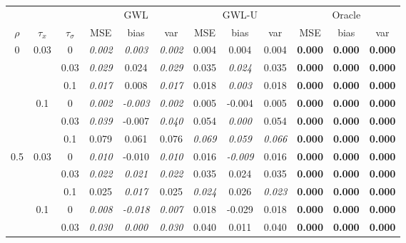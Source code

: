 \documentclass[authoryear, review, 11pt]{elsarticle}
\begin{document}
		
		\begin{table}[ht]
		\begin{center}
		\begin{tabular}{ccc | ccc | ccc | ccc }
		&&&\multicolumn{3}{c}{GWL}&\multicolumn{3}{c}{GWL-U}&\multicolumn{3}{c}{Oracle}\\
		$\rho$ & $\tau_x$ & $\tau_\sigma$ & MSE & bias & var &  MSE & bias & var &  MSE & bias & var\\   \hline
		\multirow{6}{*}{0} & \multirow{3}{*}{0.03} & 0 & \emph{0.002} & \emph{0.003} & \emph{0.002} & 0.004 & 0.004 & 0.004 & \textbf{0.000} & \textbf{0.000} & \textbf{0.000} \\ 
		 &  & 0.03 &   \emph{0.029} & 0.024 & \emph{0.029} & 0.035 & \emph{0.024} & 0.035 & \textbf{0.000} & \textbf{0.000} & \textbf{0.000} \\ 
		 &  & 0.1 &   \emph{0.017} & 0.008 & \emph{0.017} & 0.018 & \emph{0.003} & 0.018 & \textbf{0.000} & \textbf{0.000} & \textbf{0.000} \\ \cline{2-12}
		 & \multirow{3}{*}{0.1} & 0 &   \emph{0.002} & \emph{-0.003} & \emph{0.002} & 0.005 & -0.004 & 0.005 & \textbf{0.000} & \textbf{0.000} & \textbf{0.000} \\ 
		 &  & 0.03 &   \emph{0.039} & -0.007 & \emph{0.040} & 0.054 & \emph{0.000} & 0.054 & \textbf{0.000} & \textbf{0.000} & \textbf{0.000} \\ 
		 &  & 0.1 &   0.079 & 0.061 & 0.076 & \emph{0.069} & \emph{0.059} & \emph{0.066} & \textbf{0.000} & \textbf{0.000} & \textbf{0.000} \\ \cline{1-12}
		\multirow{6}{*}{0.5} & \multirow{3}{*}{0.03} & 0 &   \emph{0.010} & -0.010 & \emph{0.010} & 0.016 & \emph{-0.009} & 0.016 & \textbf{0.000} & \textbf{0.000} & \textbf{0.000} \\ 
		 &  & 0.03 &   \emph{0.022} & \emph{0.021} & \emph{0.022} & 0.035 & 0.024 & 0.035 & \textbf{0.000} & \textbf{0.000} & \textbf{0.000} \\ 
		 &  & 0.1 &   0.025 & \emph{0.017} & 0.025 & \emph{0.024} & 0.026 & \emph{0.023} & \textbf{0.000} & \textbf{0.000} & \textbf{0.000} \\ \cline{2-12}
		 & \multirow{3}{*}{0.1} & 0 &   \emph{0.008} & \emph{-0.018} & \emph{0.007} & 0.018 & -0.029 & 0.018 & \textbf{0.000} & \textbf{0.000} & \textbf{0.000} \\ 
		 &  & 0.03 &   \emph{0.030} & \emph{0.000} & \emph{0.030} & 0.040 & 0.011 & 0.040 & \textbf{0.000} & \textbf{0.000} & \textbf{0.000} \\ 

\end{tabular}
\end{center}
\end{table}
\end{document}
